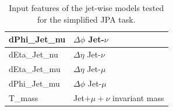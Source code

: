 \begin{minipage}{\linewidth}
\begin{minipage}{0.55\linewidth}
\begin{table}[H]
\begin{tabular}{l|l}
dPhi\_Jet\_nu & $\Delta \phi$ Jet-$\nu$\\
\midrule
dEta\_Jet\_nu & $\Delta \eta$ Jet-$\nu$\\
\midrule
dEta\_Jet\_mu & $\Delta \eta$ Jet-$\mu$\\
\midrule
dPhi\_Jet\_mu & $\Delta \phi$ Jet-$\mu$ \\
\midrule
T\_mass &  Jet$+\mu+\nu$ invariant mass\\
\bottomrule
\end{tabular}
\caption{Input features of the jet-wise models tested for the simplified JPA task.\\}
\label{tab:jet_inputs}
\end{table}
\end{minipage} 
\end{minipage}




